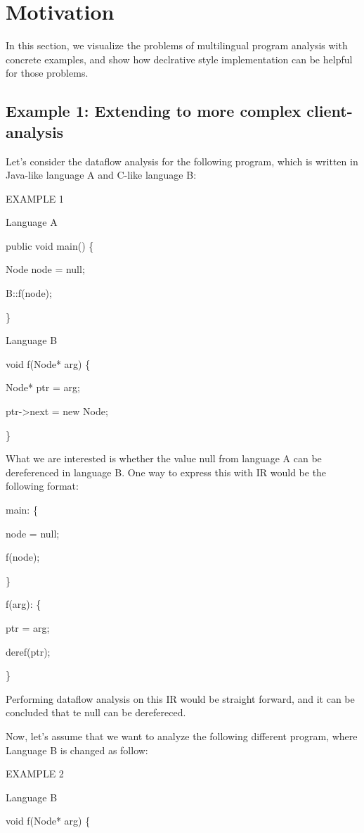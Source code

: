 \section{Motivation}

In this section, we visualize the problems of multilingual program analysis
with concrete examples, and show how declrative style implementation can be helpful
for those problems.

\subsection{Example 1: Extending to more complex client-analysis}

Let's consider the dataflow analysis for the following program,
which is written in Java-like language A and C-like language B:

EXAMPLE 1

Language A

public void main() \{

  \quad Node node = null;
 
  \quad B::f(node);

\}

Language B

void f(Node* arg) \{
  
  \quad Node* ptr = arg;

  \quad ptr->next = new Node;

\}

What we are interested is whether the value null from language A
can be dereferenced in language B. One way to express this with IR 
would be the following format: 

main: \{

  \quad node = null;
  
  \quad f(node);

\}

f(arg): \{
  
  \quad ptr = arg;
  
  \quad deref(ptr);

\}

Performing dataflow analysis on this IR would be straight forward, and it can
be concluded that te null can be derefereced.

Now, let's assume that we want to analyze the following different program,
where Language B is changed as follow:

EXAMPLE 2

Language B

void f(Node* arg) \{

